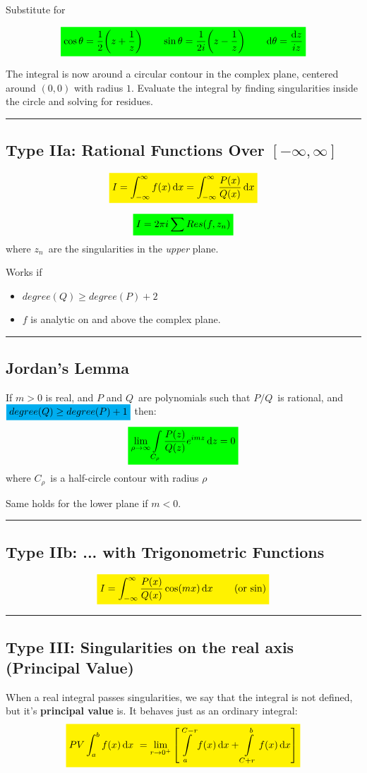 \documentclass[10pt,a4paper]{article}
\renewcommand{\exp}{e^}
\newcommand{\holine}{\rule{286pt}{1pt}}
\newcommand{\yl}[1]{\colorbox{yellow}{$\displaystyle #1$}}
\newcommand{\gr}[1]{\colorbox{green}{$\displaystyle #1$}}
\newcommand{\bl}[1]{\colorbox{cyan}{$\displaystyle #1$}}
\begin{document}
\begin{multicols}{2}
Substitute for

\[\gr{
    \cos{\theta} = \dfrac{1}{2}\qty(z+\dfrac{1}{z}) \quad\quad \sin{\theta} = \dfrac{1}{2i}\qty(z-\dfrac{1}{z}) \quad\quad \dd{\theta} = \dfrac{\dd{z}}{iz}
}\]

The integral is now around a circular contour in the complex plane, centered around $(0,0)$ with radius $1$. Evaluate the integral by finding singularities inside the circle and solving for residues.




\holine
\subsection*{Type IIa: Rational Functions Over $[-\infty, \infty]$}
\[\yl{
    I = \int_{-\infty}^\infty f(x) \dd{x} = \int_{-\infty}^\infty \dfrac{P(x)}{Q(x)} \dd{x}
}\]

\[\gr{
    I = 2\pi i \sum Res(f, z_n)
}\]
where $z_n$ are the singularities in the \textit{upper} plane.

Works if
\begin{itemize}
    \item $degree(Q) \geq degree(P) + 2$
    \item $f$ is analytic on and above the complex plane.
\end{itemize}



\holine
\subsection*{Jordan's Lemma}
If $m>0$ is real, and $P$ and $Q$ are polynomials such that $P/Q$ is rational, and $\bl{degree(Q) \geq degree(P) + 1}$ then:
\[\gr{
    \lim\limits_{\rho\rightarrow\infty}\int\limits_{C_\rho} \frac{P(z)}{Q(z)}\exp{imz} \dd{z} = 0
}\]
where $C_\rho$ is a half-circle contour with radius $\rho$

Same holds for the lower plane if $m<0$.


\holine
\subsection*{Type IIb: ... with Trigonometric Functions}
\[\yl{
    I = \int_{-\infty}^\infty \dfrac{P(x)}{Q(x)}\cos(m x) \dd{x} \quad\quad \text{(or sin)}
}\]



\holine
\subsection*{Type III: Singularities on the real axis (Principal Value)}
When a real integral passes singularities, we say that the integral is not defined, but it's \textbf{principal value} is. It behaves just as an ordinary integral:
\[
\yl{
    PV\int_a^b f(x) \dd{x} = \lim\limits_{r\rightarrow 0^+} \qty[\int\limits_a^{C-r} f(x) \dd{x} + \int\limits_{C+r}^b f(x) \dd{x} ]
}
\]


\end{multicols}
\end{document}
